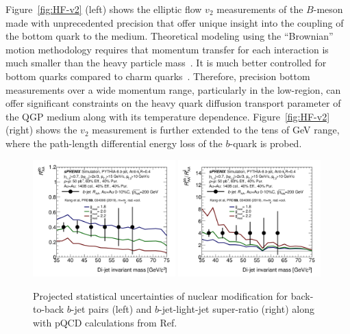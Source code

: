 Figure~\ref{fig:HF-v2} (left) shows the elliptic flow $v_2$ measurements of the
$B$-meson made with unprecedented precision that offer unique insight into
the coupling of the bottom quark to the medium.  Theoretical modeling
using the ``Brownian'' motion methodology requires that momentum
transfer for each interaction is much smaller than the heavy particle
mass~\cite{Moore:2004tg}. It is much better controlled for bottom
quarks compared to charm quarks~\cite{Das:2013kea}. Therefore,
precision bottom measurements over a wide momentum range, particularly
in the low-\pT region, can offer significant constraints on the heavy
quark diffusion transport parameter of the QGP medium along with its
temperature dependence.  Figure~\ref{fig:HF-v2} (right) shows 
the $v_2$ measurement is further extended to the tens of GeV range,
where the path-length differential energy loss of the $b$-quark is
probed.


\begin{figure}[htbp]
\centering
\includegraphics[width=0.49\textwidth]{figs/200pp_pythia8_CTEQ6L_7GeV_ALL_cfg_eneg_DSTReader_root_Draw_HFJetTruth_InvMass_CrossSection2RAA_Theory_3yr_deta0_70.pdf}
\includegraphics[width=0.49\textwidth]{figs/200pp_pythia8_CTEQ6L_7GeV_ALL_cfg_eneg_DSTReader_root_Draw_HFJetTruth_InvMass_CrossSection2RAARatio_Theory_3yr_deta0_70.pdf}
\caption{Projected statistical uncertainties of nuclear modification for back-to-back $b$-jet pairs (left) and $b$-jet-light-jet super-ratio (right) along with pQCD calculations from Ref.~\cite{Kang:2018wrs}
}
\label{fig:HF-bjet-pair}
\end{figure}

